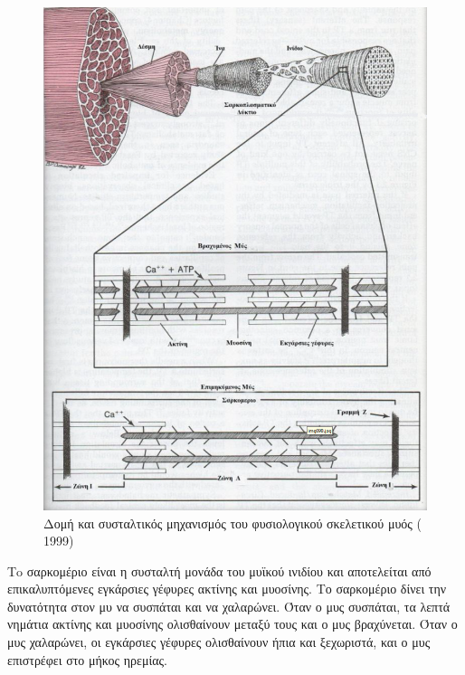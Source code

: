\begin{figure}[H]
    \centering
    \includegraphics[width=.7\textwidth, height=0.5\textheight]{neuromusculoskeletal/fig/muscle-fysiology2.png}
    \caption{Δομή και συσταλτικός μηχανισμός του φυσιολογικού σκελετικού μυός ( 1999)}
    \label{fig:muscle-fysiology2}
\end{figure}

Τo σαρκομέριο είναι η συσταλτή μονάδα του μυϊκού ινιδίου και αποτελείται από επικαλυπτόμενες εγκάρσιες γέφυρες ακτίνης και μυοσίνης. Το σαρκομέριο δίνει την δυνατότητα στον μυ να συσπάται και να χαλαρώνει. Όταν ο μυς συσπάται, τα λεπτά νημάτια ακτίνης και μυοσίνης ολισθαίνουν μεταξύ τους και ο μυς βραχύνεται. Όταν ο μυς χαλαρώνει, οι εγκάρσιες γέφυρες ολισθαίνουν ήπια και ξεχωριστά, και ο μυς επιστρέφει στο μήκος ηρεμίας.

